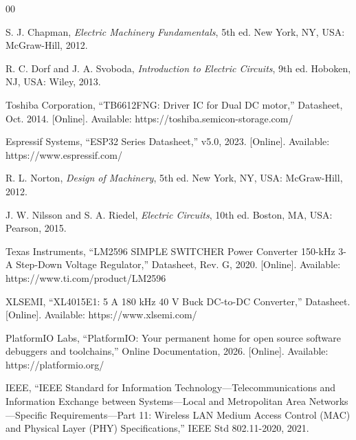 \documentclass[journal]{IEEEtran}
\begin{document}
%
%
%
\begin{thebibliography}{00}

 S. J. Chapman, \emph{Electric Machinery Fundamentals}, 5th ed. New York, NY, USA: McGraw-Hill, 2012.

 R. C. Dorf and J. A. Svoboda, \emph{Introduction to Electric Circuits}, 9th ed. Hoboken, NJ, USA: Wiley, 2013.

 Toshiba Corporation, ``TB6612FNG: Driver IC for Dual DC motor,'' Datasheet, Oct. 2014. [Online]. Available: https://toshiba.semicon-storage.com/

 Espressif Systems, ``ESP32 Series Datasheet,'' v5.0, 2023. [Online]. Available: https://www.espressif.com/

 R. L. Norton, \emph{Design of Machinery}, 5th ed. New York, NY, USA: McGraw-Hill, 2012.

 J. W. Nilsson and S. A. Riedel, \emph{Electric Circuits}, 10th ed. Boston, MA, USA: Pearson, 2015.

 Texas Instruments, ``LM2596 SIMPLE SWITCHER Power Converter 150-kHz 3-A Step-Down Voltage Regulator,'' Datasheet, Rev. G, 2020. [Online]. Available: https://www.ti.com/product/LM2596

 XLSEMI, ``XL4015E1: 5 A 180 kHz 40 V Buck DC-to-DC Converter,'' Datasheet. [Online]. Available: https://www.xlsemi.com/

 PlatformIO Labs, ``PlatformIO: Your permanent home for open source software debuggers and toolchains,'' Online Documentation, 2026. [Online]. Available: https://platformio.org/

 IEEE, ``IEEE Standard for Information Technology---Telecommunications and Information Exchange between Systems---Local and Metropolitan Area Networks---Specific Requirements---Part 11: Wireless LAN Medium Access Control (MAC) and Physical Layer (PHY) Specifications,'' IEEE Std 802.11-2020, 2021.


\end{thebibliography}
\end{document}
